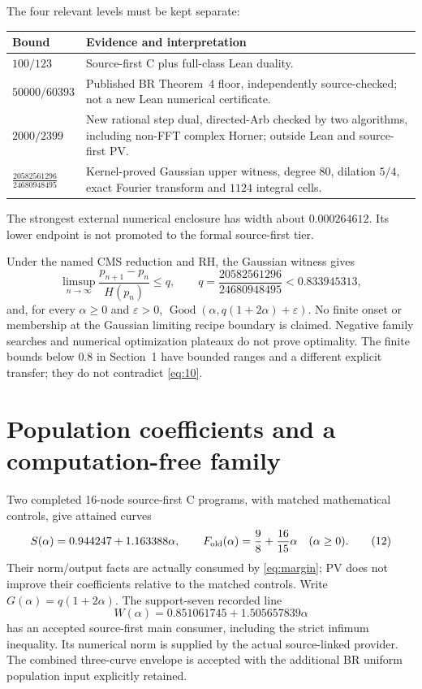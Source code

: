 \documentclass[11pt]{article}
\newcommand{\Good}{\operatorname{Good}}
\newcommand{\qG}{\frac{20582561296}{24680948495}}
\begin{document}
The four relevant levels must be kept separate:
\begin{center}
\begin{tabularx}{\linewidth}{lX}
\toprule
Bound&Evidence and interpretation\\
\midrule
\(100/123\)&Source-first C plus full-class Lean duality.\\
\(50000/60393\)&Published BR Theorem~4 floor, independently source-checked;
not a new Lean numerical certificate.\\
\(2000/2399\)&New rational step dual, directed-Arb checked by two algorithms,
including non-FFT complex Horner; outside Lean and source-first PV.\\
\(\qG\)&Kernel-proved Gaussian upper witness, degree \(80\), dilation \(5/4\),
exact Fourier transform and \(1124\) integral cells.\\
\bottomrule
\end{tabularx}
\end{center}
The strongest external numerical enclosure has width about \(0.000264612\).
Its lower endpoint is not promoted to the formal source-first tier.

Under the named CMS reduction and RH, the Gaussian witness gives
\[
 \limsup_{n\to\infty}\frac{p_{n+1}-p_n}{H(p_n)}
 \le q,\qquad q=\qG<0.833945313,
 \tag{11}
\]
and, for every \(\alpha\ge0\) and \(\varepsilon>0\),
\(\Good(\alpha,q(1+2\alpha)+\varepsilon)\).
No finite onset or membership at the Gaussian limiting recipe boundary
is claimed. Negative family searches and numerical optimization plateaux do
not prove optimality. The finite bounds below \(0.8\) in Section~1 have
bounded ranges and a different explicit transfer; they do not contradict
\eqref{eq:10}.

\section{Population coefficients and a computation-free family}
Two completed 16-node source-first C programs, with matched mathematical
controls, give attained curves
\[
 S(\alpha)=0.944247+1.163388\alpha,\qquad
 F_{\rm old}(\alpha)=\frac98+\frac{16}{15}\alpha
 \quad(\alpha\ge0).
 \tag{12}
\]
Their norm/output facts are actually consumed by \eqref{eq:margin};
PV does not improve their coefficients relative to the matched controls.
Write \(G(\alpha)=q(1+2\alpha)\).
The support-seven recorded line
\[
 W(\alpha)=0.851061745+1.505657839\alpha
 \tag{13}
\]
has an accepted source-first main consumer, including the strict infimum
inequality. Its numerical norm is supplied by the actual source-linked
provider. The combined three-curve envelope is accepted with the additional
BR uniform population input explicitly retained.
\end{document}
